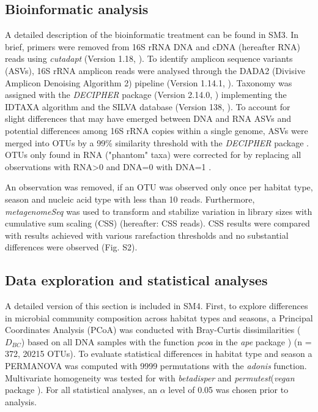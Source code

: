 \documentclass[12pt,a4paper]{article} %
\begin{document}
\subsection*{Bioinformatic analysis}
A detailed description of the bioinformatic treatment can be found in SM3. In brief, primers were removed from 16S rRNA DNA and cDNA (hereafter RNA) reads using \textit{cutadapt} (Version 1.18, \citet{Martin2013}). To identify amplicon sequence variants (ASVs), 16S rRNA amplicon reads were analysed through the DADA2 (Divisive Amplicon Denoising Algorithm 2) pipeline (Version 1.14.1, \citet{Callahan2017}). Taxonomy was assigned with the \textit{DECIPHER} package (Version 2.14.0, \citet{Wright2016}) implementing the IDTAXA algorithm \citep{Murali2018} and the SILVA database (Version 138, \citet{Pruesse2007}). To account for slight differences that may have emerged between DNA and RNA ASVs and potential differences among 16S rRNA copies within a single genome, ASVs were merged into OTUs by a 99\% similarity threshold \citep{Vetrovsky2013} with the \textit{DECIPHER} package \citep{Wright2016}. OTUs only found in RNA ("phantom" taxa) were corrected for by replacing all observations with RNA>0 and DNA=0 with DNA=1 \citep{Bowsher2019}.

An observation was removed, if an OTU was observed only once per habitat type, season and nucleic acid type with less than 10 reads. Furthermore, \textit{metagenomeSeq} was used to transform and stabilize variation in library sizes with cumulative sum scaling (CSS) \citep{Paulson2013} (hereafter: CSS reads). CSS results were compared with results achieved with various rarefaction thresholds and no substantial differences were observed (Fig. S2).

\subsection*{Data exploration and statistical analyses}
A detailed version of this section is included in SM4. First, to explore differences in microbial community composition across habitat types and seasons, a Principal Coordinates Analysis (PCoA) was conducted with Bray-Curtis dissimilarities ($D_{BC}$) \citep{Bray1957, Legendre1998} based on all DNA samples with the function \textit{pcoa} in the \textit{ape} package \citep{Paradis2018}) (n = 372, 20215 OTUs). To evaluate statistical differences in habitat type and season a PERMANOVA was computed with 9999 permutations with the \textit{adonis} function. Multivariate homogeneity was tested for with \textit{betadisper} and \textit{permutest}(\textit{vegan} package \citep{Oksanen2017}). For all statistical analyses, an $\alpha$ level of 0.05 was chosen prior to analysis.
\end{document}
